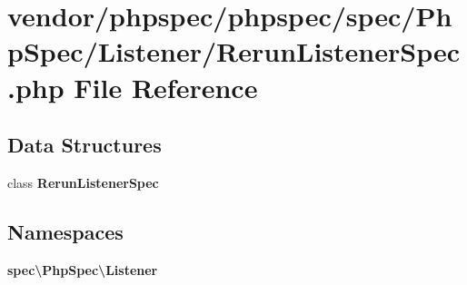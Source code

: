 \section{vendor/phpspec/phpspec/spec/\+Php\+Spec/\+Listener/\+Rerun\+Listener\+Spec.php File Reference}
\label{_rerun_listener_spec_8php}
\subsection*{Data Structures}
\begin{DoxyCompactItemize}
\item 
class {\bf Rerun\+Listener\+Spec}
\end{DoxyCompactItemize}
\subsection*{Namespaces}
\begin{DoxyCompactItemize}
\item 
 {\bf spec\textbackslash{}\+Php\+Spec\textbackslash{}\+Listener}
\end{DoxyCompactItemize}
